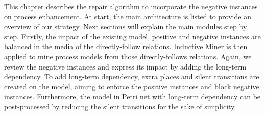 

This chapter describes the repair algorithm to incorporate the negative instances on process enhancement. At start, the main architecture is listed to provide an overview of our strategy. Next sections will explain the main modules step by step. Firstly, the impact of the existing model, positive and negative instances are balanced in the media of the directly-follow relations. Inductive Miner is then applied to mine process models from those directly-follows relations. Again, we review the negative instances and express its impact by adding the long-term dependency. To add long-term dependency, extra places and silent transitions are created on the model, aiming to enforce the positive instances and block negative instances. Furthermore, the model in Petri net with long-term dependency can be  post-processed by reducing the silent transitions for the sake of simplicity.
